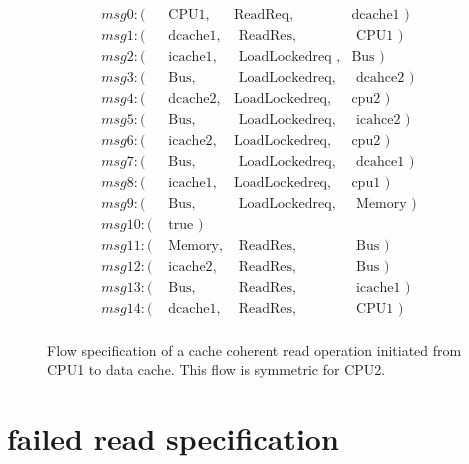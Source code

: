 \documentclass[conference]{IEEEtran}
\begin{document}
\begin{figure}
 {\footnotesize
 \[
 \begin{array}{llll}
 msg0: (&\mbox{ CPU1},&\mbox{ReadReq},&\mbox{dcache1  })\\                   
 msg1: (&\mbox{ dcache1},&\mbox{ ReadRes},&\mbox{ CPU1 })\\
 msg2: (&\mbox{ icache1},&\mbox{ LoadLockedreq },&\mbox{Bus })\\     
 msg3: (&\mbox{ Bus},&\mbox{ LoadLockedreq},&\mbox{ dcahce2     })\\
 msg4: (&\mbox{ dcache2},&\mbox{LoadLockedreq},&\mbox{cpu2 })\\
 msg5: (&\mbox{ Bus},&\mbox{ LoadLockedreq},&\mbox{ icahce2     })\\ 
 msg6: (&\mbox{ icache2},&\mbox{LoadLockedreq},&\mbox{cpu2     })\\
 msg7: (&\mbox{ Bus},&\mbox{ LoadLockedreq},&\mbox{ dcahce1 })\\
 msg8: (&\mbox{ icache1},&\mbox{LoadLockedreq},&\mbox{cpu1       })\\
 msg9: (&\mbox{ Bus},&\mbox{ LoadLockedreq},&\mbox{ Memory     })\\
 msg10: (&\mbox{ true })\\
 msg11: (&\mbox{ Memory},&\mbox{ ReadRes},&\mbox{ Bus       })\\     
 msg12: (&\mbox{ icache2},&\mbox{ ReadRes},&\mbox{ Bus    })\\
 msg13: (&\mbox{ Bus},&\mbox{ ReadRes},&\mbox{ icache1 })\\
 msg14: (&\mbox{ dcache1},&\mbox{ ReadRes},&\mbox{ CPU1 })\\
 \end{array}
 \]}
 \caption{Flow specification of a cache coherent read operation initiated from CPU1 to  data cache. This flow is symmetric for CPU2. }
 \label{read-dcache}
 
 \end{figure}

\section{failed read specification}
\end{document}
